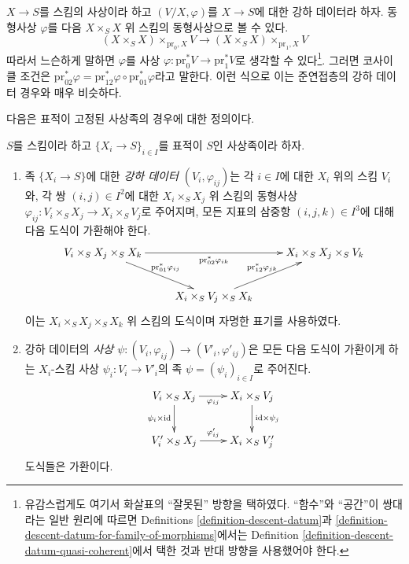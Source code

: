 \begin{remark}
\label{remark-easier}
$X \to S$를 스킴의 사상이라 하고 $(V/X, \varphi)$를 $X \to S$에 대한
강하 데이터라 하자. 동형사상 $\varphi$를 다음 $X \times_S X$ 위
스킴의 동형사상으로 볼 수 있다.
$$
(X \times_S X) \times_{\text{pr}_0, X} V
\longrightarrow
(X \times_S X) \times_{\text{pr}_1, X} V
$$
따라서 느슨하게 말하면 $\varphi$를 사상
$\varphi : \text{pr}_0^*V \to \text{pr}_1^*V$로 생각할 수 있다\footnote{유감스럽게도
여기서 화살표의 ``잘못된'' 방향을 택하였다. ``함수''와 ``공간''이
쌍대라는 일반 원리에 따르면 Definitions \ref{definition-descent-datum}과
\ref{definition-descent-datum-for-family-of-morphisms}에서는 Definition
\ref{definition-descent-datum-quasi-coherent}에서 택한 것과 반대 방향을
사용했어야 한다.}. 그러면 코사이클 조건은
$\text{pr}_{02}^*\varphi =
\text{pr}_{12}^*\varphi \circ \text{pr}_{01}^*\varphi$라고 말한다.
이런 식으로 이는 준연접층의 강하 데이터 경우와 매우 비슷하다.
\end{remark}

\noindent
다음은 표적이 고정된 사상족의 경우에 대한 정의이다.

\begin{definition}
\label{definition-descent-datum-for-family-of-morphisms}
$S$를 스킴이라 하고 $\{X_i \to S\}_{i \in I}$를 표적이 $S$인
사상족이라 하자.
\begin{enumerate}
\item 족 $\{X_i \to S\}$에 대한 {\it 강하 데이터
$(V_i, \varphi_{ij})$}는 각 $i \in I$에 대한 $X_i$ 위의 스킴 $V_i$와,
각 쌍 $(i, j) \in I^2$에 대한 $X_i \times_S X_j$ 위 스킴의 동형사상
$\varphi_{ij} : V_i \times_S X_j \to X_i \times_S V_j$로 주어지며,
모든 지표의 삼중항 $(i, j, k) \in I^3$에 대해 다음 도식이 가환해야
한다.
$$
\xymatrix{
V_i \times_S X_j \times_S X_k
\ar[rd]^{\text{pr}_{01}^*\varphi_{ij}}
\ar[rr]_{\text{pr}_{02}^*\varphi_{ik}} &
&
X_i \times_S X_j \times_S V_k\\
&
X_i \times_S V_j \times_S X_k
\ar[ru]^{\text{pr}_{12}^*\varphi_{jk}}
}
$$
이는 $X_i \times_S X_j \times_S X_k$ 위 스킴의 도식이며 자명한
표기를 사용하였다.
\item 강하 데이터의 {\it 사상
$\psi : (V_i, \varphi_{ij}) \to (V'_i, \varphi'_{ij})$}은 모든 다음
도식이 가환이게 하는 $X_i$-스킴 사상 $\psi_i : V_i \to V'_i$의 족
$\psi = (\psi_i)_{i \in I}$로 주어진다.
$$
\xymatrix{
V_i \times_S X_j \ar[r]_{\varphi_{ij}} \ar[d]_{\psi_i \times \text{id}} &
X_i \times_S V_j \ar[d]^{\text{id} \times \psi_j} \\
V'_i \times_S X_j \ar[r]^{\varphi'_{ij}} & X_i \times_S V'_j
}
$$
도식들은 가환이다.
\end{enumerate}
\end{definition}


